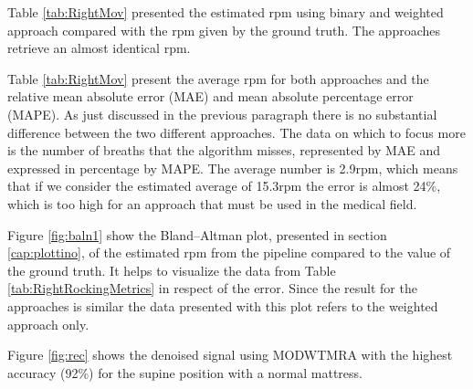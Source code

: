 Table \ref{tab:RightMov} presented the estimated rpm using binary and weighted approach compared with the rpm given by the ground truth. The approaches retrieve an almost identical rpm. 

\vspace{0.5cm}


Table \ref{tab:RightMov} present the average rpm for both approaches  
and the relative mean absolute error (MAE) and mean absolute percentage error (MAPE). As just discussed in the previous paragraph there is no substantial difference between the two different approaches. The data on which to focus more is the number of breaths that the algorithm misses, represented by MAE and expressed in percentage by MAPE. The average number is 2.9rpm, which means that if we consider the estimated average of 15.3rpm the error is almost 24\%, which is too high for an approach that must be used in the medical field.



Figure \ref{fig:baln1} show the Bland–Altman plot, presented in section \ref{cap:plottino}, of the estimated rpm from the pipeline compared to the value of the ground truth. It helps to visualize the data from Table \ref{tab:RightRockingMetrics} in respect of the error. Since the result for the approaches is similar the data presented with this plot refers to the weighted approach only.

Figure \ref{fig:rec} shows the denoised signal using MODWTMRA with the highest accuracy (92\%) for the supine position with a normal mattress.

